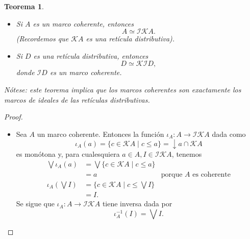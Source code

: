 \documentclass[12pt,letterpaper,titlepage]{article}
\newtheorem{thm}{Teorema}
\theoremstyle{definition}
\newcommand\Sup{\bigvee}
\newcommand\down{{\downarrow}}
\renewcommand\cal[1]{\mathcal{#1}}
\newcommand\<{\langle}
\renewcommand\>{\rangle}
\begin{document}
\begin{thm}
    \begin{itemize}
        \item Si $A$ es un marco coherente, entonces
        \[
            A\simeq \cal I\cal KA
        .\]
        (Recordemos que $\cal KA$ es una retícula distributiva).
        \item Si $D$ es una retícula distributiva, entonces
        \[
            D \simeq \cal K\cal ID
        ,\]
        donde $\cal ID$ es un marco coherente.
    \end{itemize}
    Nótese: este teorema implica que los marcos coherentes
    son exactamente los marcos de ideales de las retículas
    distributivas.
\end{thm}
\begin{proof}
    \begin{itemize}
        \item
        Sea $A$ un marco coherente.
        Entonces la función $\iota_A:A\to\cal I\cal KA$ dada como
        \[
            \iota_A(a) = \{c\in\cal KA\mid c\leq a\}
            =\down a\cap\cal KA
        \]
        es monótona y, para cualesquiera $a\in A, I\in\cal I\cal KA$,
        tenemos
        \begin{align*}
            \Sup\iota_A(a)
            &= \Sup\{c\in\cal KA\mid c\leq a\} \\
            &= a & \text{porque $A$ es coherente} \\
            \iota_A(\Sup I)
            &= \{c\in\cal KA\mid c\leq \Sup I\} \\
            &= I.
        \end{align*}
        Se sigue que $\iota_A:A\to\cal I\cal KA$ tiene inversa
        dada por
        \[
            \iota_A^{-1}(I) = \Sup I
        .\]
        

\end{itemize}
\end{proof}
\end{document}
